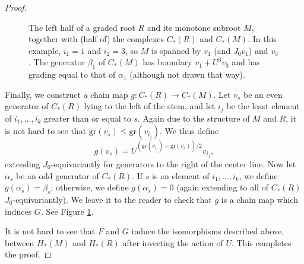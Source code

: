 \documentclass[11 pt]{amsart}
\theoremstyle{remark}
\def\gr{\mathrm{gr}}
\begin{document}
\begin{proof}
\begin{figure}[h!]
\caption{The left half of a graded root $R$ and its monotone subroot $M$, together with (half of) the complexes $C_*(R)$ and $C_*(M)$. In this example, $i_1 = 1$ and $i_2 = 3$, so $M$ is spanned by $v_1$ (and $J_0v_1$) and $v_3$. The generator $\beta_1$ of $C_*(M)$ has boundary $v_1 + U^3v_3$ and has grading equal to that of $\alpha_1$ (although not drawn that way).}
\label{figchainmapex}
\end{figure}


Finally, we construct a chain map $g: C_*(R) \rightarrow C_*(M)$. Let $v_s$ be an even generator of $C_*(R)$ lying to the left of the stem, and let $i_j$ be the least element of $i_1, \ldots, i_k$ greater than or equal to $s$. Again due to the structure of $M$ and $R$, it is not hard to see that $\gr(v_s) \leq \gr(v_{i_j})$. We thus define
\[
g(v_s) = U^{(\gr(v_{i_j})-\gr(v_s))/2} v_{i_j},
\]
extending $J_0$-equivariantly for generators to the right of the center line. Now let $\alpha_s$ be an odd generator of $C_*(R)$. If $s$ is an element of $i_1, \ldots, i_k$, we define $g(\alpha_s) = \beta_s$; otherwise, we define $g(\alpha_s) = 0$ (again extending to all of $C_*(R)$ $J_0$-equivariantly). We leave it to the reader to check that $g$ is a chain map which induces $G$. See Figure \ref{figchainmapex}. 

It is not hard to see that $F$ and $G$ induce the isomorphisms described above, between $H_*(M)$ and $H_*(R)$ after inverting the action of $U$. This completes the proof.
\end{proof}
 
\end{document}
